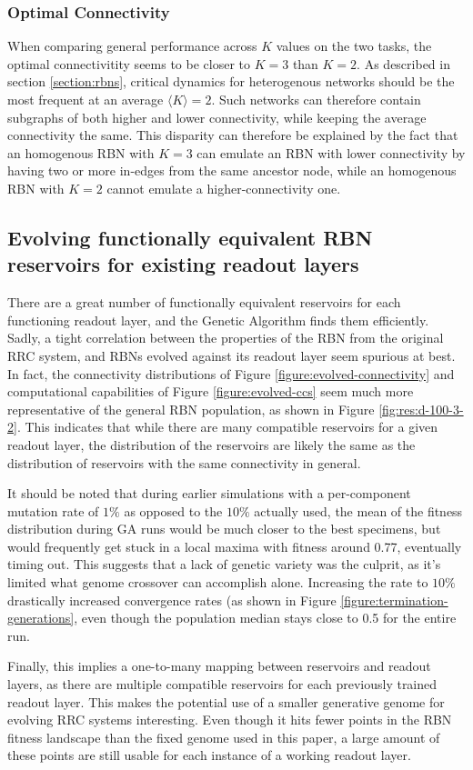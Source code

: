\subsubsection{Optimal Connectivity}
When comparing general performance across $K$ values on the two tasks,
the optimal connectivitity seems to be closer to $K=3$ than $K=2$.
As described in section \ref{section:rbns},
critical dynamics for heterogenous networks should be the most frequent at an average $\langle K \rangle = 2$.
Such networks can therefore contain subgraphs of both higher and lower connectivity,
while keeping the average connectivity the same.
This disparity can therefore be explained by the fact that an homogenous RBN with $K=3$ can emulate an RBN with lower connectivity by having two or more in-edges from the same ancestor node,
while an homogenous RBN with $K=2$ cannot emulate a higher-connectivity one.

\subsection{Evolving functionally equivalent RBN reservoirs for existing readout layers}

There are a great number of functionally equivalent reservoirs for each functioning readout layer,
and the Genetic Algorithm finds them efficiently.
Sadly, a tight correlation between the properties of the RBN from the original RRC system,
and RBNs evolved against its readout layer seem spurious at best.
In fact, the connectivity distributions of Figure \ref{figure:evolved-connectivity} and computational capabilities of Figure \ref{figure:evolved-ccs} seem much more representative of the general RBN population, as shown in Figure \ref{fig:res:d-100-3-2}.
This indicates that while there are many compatible reservoirs for a given readout layer,
the distribution of the reservoirs are likely the same as the distribution of reservoirs with the same connectivity in general.

It should be noted that during earlier simulations with a per-component mutation rate of $1\%$ as opposed to the $10\%$ actually used,
the mean of the fitness distribution during GA runs would be much closer to the best specimens,
but would frequently get stuck in a local maxima with fitness around 0.77, eventually timing out.
This suggests that a lack of genetic variety was the culprit,
as it's limited what genome crossover can accomplish alone.
Increasing the rate to $10\%$ drastically increased convergence rates (as shown in Figure \ref{figure:termination-generations},
even though the population median stays close to 0.5 for the entire run.

Finally, this implies a one-to-many mapping between reservoirs and readout layers,
as there are multiple compatible reservoirs for each previously trained readout layer.
This makes the potential use of a smaller generative genome for evolving RRC systems interesting.
Even though it hits fewer points in the RBN fitness landscape than the fixed genome used in this paper,
a large amount of these points are still usable for each instance of a working readout layer.
